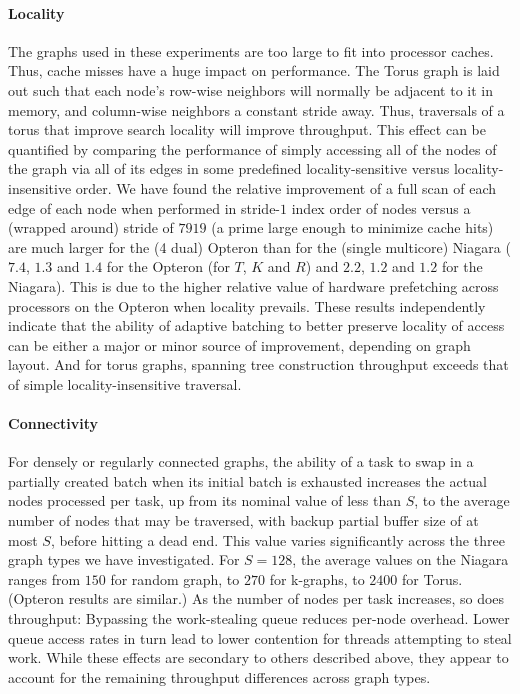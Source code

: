 \paragraph{Locality} The graphs used in these experiments are too large to fit
into processor caches. Thus, cache misses have a huge impact on
performance. The Torus graph is laid out such that each node's
row-wise neighbors will normally be adjacent to it in memory, and
column-wise neighbors a constant stride away. Thus, traversals of a
torus that improve search locality will improve throughput.  This
effect can be quantified by comparing the performance of simply
accessing all of the nodes of the graph via all of its edges in some
predefined locality-sensitive versus locality-insensitive order.  We
have found the relative improvement of a full scan of each edge of
each node when performed in stride-$1$ index order of nodes versus a
(wrapped around) stride of $7919$ (a prime large enough to minimize
cache hits) are much larger for the (4 dual) Opteron than for the
(single multicore) Niagara ($7.4$, $1.3$ and $1.4$ for the Opteron
(for $T$, $K$ and $R$) and $2.2$, $1.2$ and $1.2$ for the Niagara).
This is due to the higher relative value of hardware prefetching
across processors on the Opteron when locality prevails.  These
results independently indicate that the ability of adaptive batching
to better preserve locality of access can be either a major or minor
source of improvement, depending on graph layout.  And for torus
graphs, spanning tree construction throughput exceeds that of simple
locality-insensitive traversal.

\paragraph{Connectivity}  For densely or regularly connected graphs, the
ability of a task to swap in a partially created batch when its
initial batch is exhausted increases the actual nodes processed per
task, up from its nominal value of less than $S$, to the average number
of nodes that may be traversed, with backup partial buffer size of at
most $S$, before hitting a dead end. This value varies significantly
across the three graph types we have investigated. For $S=128$, the
average values on the Niagara ranges from $150$ for random graph, to $270$
for k-graphs, to $2400$ for Torus. (Opteron results are similar.) As the
number of nodes per task increases, so does throughput: Bypassing the
work-stealing queue reduces per-node overhead.  Lower queue access
rates in turn lead to lower contention for threads attempting to steal
work. While these effects are secondary to others described above,
they appear to account for the remaining throughput differences across
graph types.

